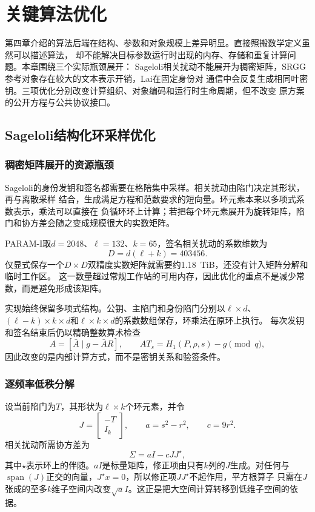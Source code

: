 \chapter{关键算法优化}

第四章介绍的算法后端在结构、参数和对象规模上差异明显。直接照搬数学定义虽然可以描述算法，
却不能解决目标参数运行时出现的内存、存储和重复计算问题。本章围绕三个实际瓶颈展开：
Sageloli相关扰动不能展开为稠密矩阵，SRGG参考对象存在较大的文本表示开销，Lai在固定身份对
通信中会反复生成相同叶密钥。三项优化分别改变计算组织、对象编码和运行时生命周期，但不改变
原方案的公开方程与公共协议接口。

\section{Sageloli结构化环采样优化}

\subsection{稠密矩阵展开的资源瓶颈}

Sageloli的身份发钥和签名都需要在格陪集中采样。相关扰动由陷门决定其形状，再与离散采样
结合，生成满足方程和范数要求的短向量。环元素本来以多项式系数表示，乘法可以直接在
负循环环上计算；若把每个环元素展开为旋转矩阵，陷门和协方差会随之变成规模很大的实数矩阵。

PARAM-I取$d=2048$、$\ell=132$、$k=65$，签名相关扰动的系数维数为
\[
 D=d(\ell+k)=403456.
\]
仅显式保存一个$D\times D$双精度实数矩阵就需要约1.18~TiB，还没有计入矩阵分解和临时工作区。
这一数量超过常规工作站的可用内存，因此优化的重点不是减少常数，而是避免形成该矩阵。

实现始终保留多项式结构。公钥、主陷门和身份陷门分别以$\ell\times d$、
$(\ell-k)\times k\times d$和$\ell\times k\times d$的系数数组保存，环乘法在原环上执行。
每次发钥和签名结束后仍以精确整数算术检查
\[
 A=[\bar A\mid g-\bar AR],\qquad
 AT_s=H_1(P,\rho,s)-g\pmod q,
\]
因此改变的是内部计算方式，而不是密钥关系和验签条件。

\subsection{逐频率低秩分解}

设当前陷门为$T$，其形状为$\ell\times k$个环元素，并令
\[
 J=\begin{bmatrix}-T\\I_k\end{bmatrix},\qquad
 a=s^2-r^2,\qquad c=9r^2.
\]
相关扰动所需协方差为
\[
 \Sigma=aI-cJJ^\star,
\]
其中$\star$表示环上的伴随。$aI$是标量矩阵，修正项由只有$k$列的$J$生成。对任何与
$\operatorname{span}(J)$正交的向量，$J^\star x=0$，所以修正项$JJ^\star$不起作用，平方根算子
只需在$J$张成的至多$k$维子空间内改变$\sqrt a I$。这正是把大空间计算转移到低维子空间的依据。

